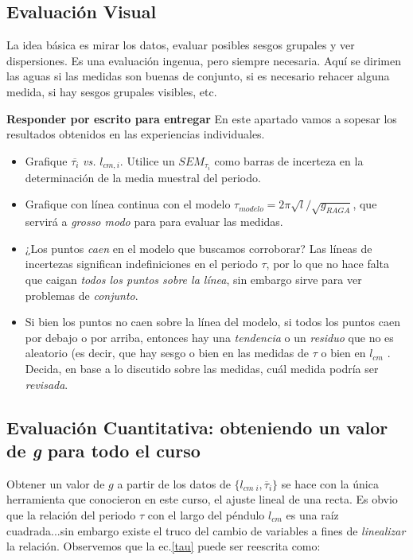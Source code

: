 \documentclass[10pt,a4paper]{article}
\numberwithin{equation}{section}%
\numberwithin{equation}{subsection}
\begin{document}
\subsection{Evaluación Visual}

La idea básica es mirar los datos, evaluar posibles sesgos grupales y ver dispersiones. Es una evaluación ingenua, pero siempre necesaria. Aquí se dirimen las aguas si las medidas son buenas de conjunto, si es necesario rehacer alguna medida, si hay sesgos grupales visibles, etc.


\noindent \textbf{Responder por escrito para entregar}
En este apartado vamos a sopesar los resultados obtenidos en las experiencias individuales.

\begin{itemize}
\item[a)] Grafique $\overline{\tau_i}$ \textit{vs.} $l_{cm, i}$. Utilice un $SEM_{\tau_i}$ como barras de incerteza en la determinación de la media muestral del periodo.
\item[b)] Grafique con línea continua con el modelo $ \tau_{modelo} = 2\pi \sqrt{l} / \sqrt{g_{RAGA}}$, que servirá a \textit{grosso modo} para para evaluar las medidas.
\item[d)] ¿Los puntos \textit{caen} en el modelo que buscamos corroborar? Las líneas de incertezas significan indefiniciones en el periodo $\tau$, por lo que no hace falta que caigan \textit{todos los puntos sobre la línea}, sin embargo sirve para ver problemas de \textit{conjunto}.
\item[e)] Si bien los puntos no caen sobre la línea del modelo, si todos los puntos caen por debajo o por arriba, entonces hay una \textit{tendencia} o un \textit{residuo} que no es aleatorio (es decir, que hay sesgo o bien en las medidas de $\tau$ o bien en $l_{cm}$ . Decida, en base a lo discutido sobre las medidas, cuál medida podría ser \textit{revisada}.
\end{itemize}


\subsection{Evaluación Cuantitativa: obteniendo un valor de \textit{g} para todo el curso}

Obtener un valor de $g$ a partir de los datos de $\{ l_{cm \;i},  \overline{\tau}_i \}$ se hace con la única herramienta que conocieron en este curso, el ajuste lineal de una recta. Es obvio que la relación del periodo $\tau$ con el largo del péndulo $l_{cm}$ es una raíz cuadrada...sin embargo existe el truco del cambio de variables a fines de \textit{linealizar} la relación. Observemos que la ec.\eqref{tau} puede ser reescrita como:
\end{document}

